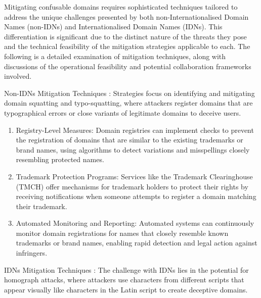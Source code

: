 Mitigating confusable domains requires sophisticated techniques tailored to address the unique challenges presented by both non-Internationalised Domain Names (non-IDNs) and Internationalised Domain Names (IDNs). This differentiation is significant due to the distinct nature of the threats they pose and the technical feasibility of the mitigation strategies applicable to each. The following is a detailed examination of mitigation techniques, along with discussions of the operational feasibility and potential collaboration frameworks involved.

Non-IDNs Mitigation Techniques : Strategies focus on identifying and mitigating domain squatting and typo-squatting, where attackers register domains that are typographical errors or close variants of legitimate domains to deceive users.

\begin{enumerate}
  \item Registry-Level Measures: Domain registries can implement checks to prevent the registration of domains that are similar to the existing trademarks or brand names, using algorithms to detect variations and misspellings closely resembling protected names. \cite{WTR2020} 
  \item Trademark Protection Programs: Services like the Trademark Clearinghouse (TMCH) offer mechanisms for trademark holders to protect their rights by receiving notifications when someone attempts to register a domain matching their trademark. \cite{ICANNTMCH}
  \item Automated Monitoring and Reporting: Automated systems can continuously monitor domain registrations for names that closely resemble known trademarks or brand names, enabling rapid detection and legal action against infringers. \cite{TMCH2023}
\end{enumerate}

IDNs Mitigation Techniques : The challenge with IDNs lies in the potential for homograph attacks, where attackers use characters from different scripts that appear visually like characters in the Latin script to create deceptive domains.

